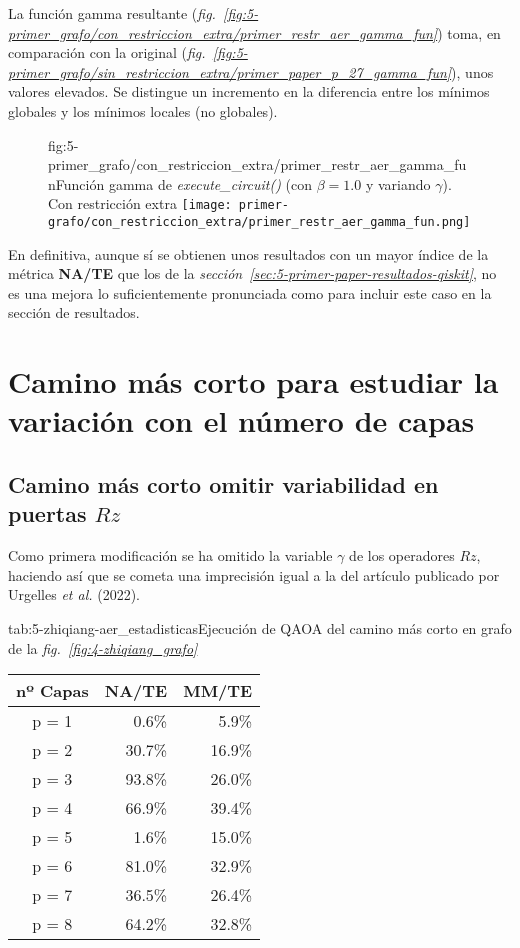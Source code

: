 La función gamma resultante (\textit{fig.~\ref{fig:5-primer_grafo/con_restriccion_extra/primer_restr_aer_gamma_fun}}) toma, en comparación con la original (\textit{fig.~\ref{fig:5-primer_grafo/sin_restriccion_extra/primer_paper_p_27_gamma_fun}}), unos valores elevados.
Se distingue un incremento en la diferencia entre los mínimos globales y los mínimos locales (no globales).

\begin{figure}[Resultados QAOA {--} artículo de Fan \textit{et al.} (2023) {--} función gamma con restricción extra]{fig:5-primer_grafo/con_restriccion_extra/primer_restr_aer_gamma_fun}{Función gamma de \textit{execute\_circuit()} (con $\beta = 1.0$ y variando $\gamma$). Con restricción extra}
  \centering
  \texttt{[image: primer-grafo/con\_restriccion\_extra/primer\_restr\_aer\_gamma\_fun.png]}
\end{figure}

En definitiva, aunque sí se obtienen unos resultados con un mayor índice de la métrica \textbf{NA/TE} que los de la \textit{sección~\ref{sec:5-primer-paper-resultados-qiskit}}, no es una mejora lo suficientemente pronunciada como para incluir este caso en la sección de resultados.


\section{Camino más corto para estudiar la variación con el número de capas\label{sec:8-zhiqiang}}

\subsection{Camino más corto omitir variabilidad en puertas $Rz$}

Como primera modificación se ha omitido la variable $\gamma$ de los operadores $Rz$, haciendo así que se cometa una imprecisión igual a la del artículo publicado por Urgelles \textit{et al.} (2022)\cite{multi-objective_routing_optimization}.

\begin{table}[Resultados QAOA {--} artículo de Fan \textit{et al.} (2023) {--} puertas $Rz$ constantes]{tab:5-zhiqiang-aer_estadisticas}{Ejecución de QAOA del camino más corto en grafo de la \textit{fig.~\ref{fig:4-zhiqiang_grafo}}}
  \centering
  \begin{tabular}{|c|r|r|}
    \hline
    \textbf{nº Capas} & \textbf{NA/TE} & \textbf{MM/TE} \\ \hline
    p = 1 &  0.6\% &  5.9\% \\ \hline
    p = 2 & 30.7\% & 16.9\% \\ \hline
    p = 3 & 93.8\% & 26.0\% \\ \hline
    p = 4 & 66.9\% & 39.4\% \\ \hline
    p = 5 &  1.6\% & 15.0\% \\ \hline
    p = 6 & 81.0\% & 32.9\% \\ \hline
    p = 7 & 36.5\% & 26.4\% \\ \hline
    p = 8 & 64.2\% & 32.8\% \\ \hline
  \end{tabular}
\end{table}

